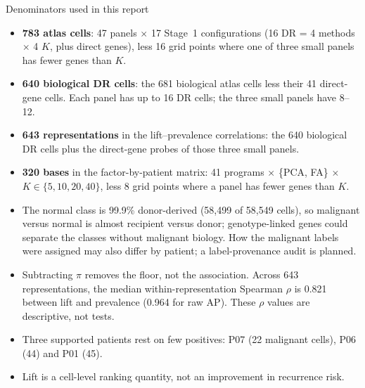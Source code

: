 \begin{explainbox}{Denominators used in this report}
\begin{itemize}[leftmargin=1.2em]
\item \textbf{783 atlas cells}: 47 panels $\times$ 17 Stage~1 configurations (16 DR = 4 methods $\times$ 4 $K$, plus direct genes), less 16 grid points where one of three small panels has fewer genes than $K$.
\item \textbf{640 biological DR cells}: the 681 biological atlas cells less their 41 direct-gene cells. Each panel has up to 16 DR cells; the three small panels have 8--12.
\item \textbf{643 representations} in the lift--prevalence correlations: the 640 biological DR cells plus the direct-gene probes of those three small panels.
\item \textbf{320 bases} in the factor-by-patient matrix: 41 programs $\times$ \{PCA, FA\} $\times$ $K \in \{5, 10, 20, 40\}$, less 8 grid points where a panel has fewer genes than $K$.
\end{itemize}
\end{explainbox}

\begin{caveatbox}
\begin{itemize}
  \item The normal class is 99.9\% donor-derived (58,499 of 58,549 cells), so malignant versus normal is almost recipient versus donor; genotype-linked genes could separate the classes without malignant biology. How the malignant labels were assigned may also differ by patient; a label-provenance audit is planned.
  \item Subtracting $\pi$ removes the floor, not the association. Across 643 representations, the median within-representation Spearman $\rho$ is 0.821 between lift and prevalence (0.964 for raw AP). These $\rho$ values are descriptive, not tests.
  \item Three supported patients rest on few positives: P07 (22 malignant cells), P06 (44) and P01 (45).
  \item Lift is a cell-level ranking quantity, not an improvement in recurrence risk.
\end{itemize}
\end{caveatbox}

